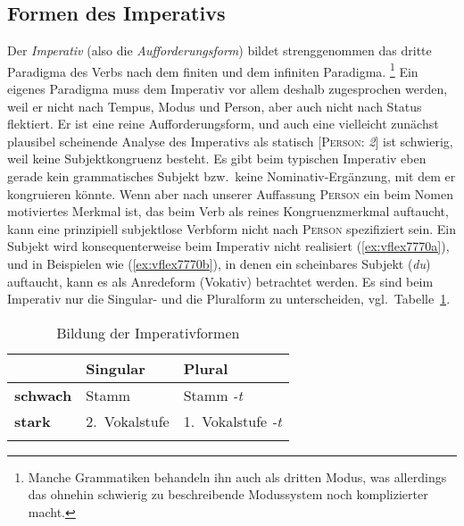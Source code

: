 \subsection{Formen des Imperativs}

\label{sec:impflex}


Der \textit{Imperativ} (also die \textit{Aufforderungsform}) bildet strenggenommen das dritte Paradigma des Verbs nach dem finiten und dem infiniten Paradigma.%
\footnote{Manche Grammatiken behandeln ihn auch als dritten Modus, was allerdings das ohnehin schwierig zu beschreibende Modussystem noch komplizierter macht.}
Ein eigenes Paradigma muss dem Imperativ vor allem deshalb zugesprochen werden, weil er nicht nach Tempus, Modus und Person, aber auch nicht nach Status flektiert.
Er ist eine reine Aufforderungsform, und auch eine vielleicht zunächst plausibel scheinende Analyse des Imperativs als statisch [\textsc{Person}: \textit{2}] ist schwierig, weil keine Subjektkongruenz besteht.
Es gibt beim typischen Imperativ eben gerade kein grammatisches Subjekt bzw.\ keine Nominativ-Ergänzung, mit dem er kongruieren könnte.
Wenn aber nach unserer Auffassung \textsc{Person} ein beim Nomen motiviertes Merkmal ist, das beim Verb als reines Kongruenzmerkmal auftaucht, kann eine prinzipiell subjektlose Verbform nicht nach \textsc{Person} spezifiziert sein.
Ein Subjekt wird konsequenterweise beim Imperativ nicht realisiert (\ref{ex:vflex7770a}), und in Beispielen wie (\ref{ex:vflex7770b}), in denen ein scheinbares Subjekt (\textit{du}) auftaucht, kann es als Anredeform (Vokativ) betrachtet werden.
Es sind beim Imperativ nur die Singular- und die Pluralform zu unterscheiden, vgl.\ Tabelle~\ref{tab:imp}.

\begin{exe}
  \ex\label{ex:vflex7770}
  \begin{xlist}
  \end{xlist}
\end{exe}


\begin{table}
  \centering
  \begin{tabular}{lll}
    \lsptoprule
    & \textbf{Singular} & \textbf{Plural} \\
    \midrule
    \textbf{schwach} & Stamm & Stamm \textit{-t} \\
    \textbf{stark} & 2.~Vokalstufe & 1.~Vokalstufe \textit{-t} \\
    \lspbottomrule
  \end{tabular}
  \caption{Bildung der Imperativformen}
  \label{tab:imp}
\end{table}

